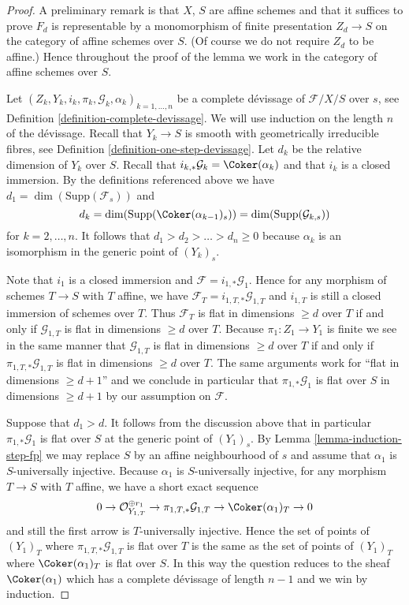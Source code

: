 \begin{proof}
A preliminary remark is that $X$, $S$ are affine schemes and that it
suffices to prove $F_d$ is representable by a monomorphism of finite
presentation $Z_d \to S$ on the category of affine schemes over $S$.
(Of course we do not require $Z_d$ to be affine.)
Hence throughout the proof of
the lemma we work in the category of affine schemes over $S$.

\medskip\noindent
Let $(Z_k, Y_k, i_k, \pi_k, \mathcal{G}_k, \alpha_k)_{k = 1, \ldots, n}$
be a complete d\'evissage of $\mathcal{F}/X/S$ over $s$, see
Definition \ref{definition-complete-devissage}.
We will use induction on the length $n$ of the d\'evissage.
Recall that $Y_k \to S$ is smooth with geometrically irreducible fibres, see
Definition \ref{definition-one-step-devissage}.
Let $d_k$ be the relative dimension of $Y_k$ over $S$.
Recall that $i_{k, *}\mathcal{G}_k = \Coker(\alpha_k)$ and
that $i_k$ is a closed immersion.
By the definitions referenced above we have
$d_1 = \dim(\text{Supp}(\mathcal{F}_s))$ and
$$
d_k = \dim(\text{Supp}(\Coker(\alpha_{k - 1})_s))
= \dim(\text{Supp}(\mathcal{G}_{k, s}))
$$
for $k = 2, \ldots, n$. It follows that $d_1 > d_2 > \ldots > d_n \geq 0$
because $\alpha_k$ is an isomorphism in the generic point of $(Y_k)_s$.

\medskip\noindent
Note that $i_1$ is a closed immersion and
$\mathcal{F} = i_{1, *}\mathcal{G}_1$.
Hence for any morphism of schemes $T \to S$ with $T$ affine,
we have $\mathcal{F}_T = i_{1, T, *}\mathcal{G}_{1, T}$ and
$i_{1, T}$ is still a closed immersion of schemes over $T$.
Thus $\mathcal{F}_T$ is flat in dimensions $\geq d$ over $T$
if and only if $\mathcal{G}_{1, T}$ is flat in dimensions $\geq d$ over $T$.
Because $\pi_1 : Z_1 \to Y_1$ is finite we see in the same manner that
$\mathcal{G}_{1, T}$ is flat in dimensions $\geq d$ over $T$
if and only if $\pi_{1, T, *}\mathcal{G}_{1, T}$ is flat in dimensions
$\geq d$ over $T$. The same arguments work for
``flat in dimensions $\geq d + 1$'' and we conclude in particular that
$\pi_{1, *}\mathcal{G}_1$ is flat over $S$ in dimensions $\geq d + 1$
by our assumption on $\mathcal{F}$.

\medskip\noindent
Suppose that $d_1 > d$. It follows from the discussion above that
in particular $\pi_{1, *}\mathcal{G}_1$ is flat over $S$ at
the generic point of $(Y_1)_s$. By
Lemma \ref{lemma-induction-step-fp}
we may replace $S$ by an affine neighbourhood of $s$ and assume that
$\alpha_1$ is $S$-universally injective. Because $\alpha_1$ is
$S$-universally injective, for any morphism $T \to S$ with $T$ affine,
we have a short exact sequence
$$
0 \to \mathcal{O}_{Y_{1, T}}^{\oplus r_1}
\to \pi_{1, T, *}\mathcal{G}_{1, T} \to \Coker(\alpha_1)_T \to 0
$$
and still the first arrow is $T$-universally injective. Hence the set
of points of $(Y_1)_T$ where $\pi_{1, T, *}\mathcal{G}_{1, T}$ is flat over
$T$ is the same as the set of points of $(Y_1)_T$ where
$\Coker(\alpha_1)_T$ is flat over $S$. In this way the question
reduces to the sheaf $\Coker(\alpha_1)$ which has a complete
d\'evissage of length $n - 1$ and we win by induction.


\end{proof}
